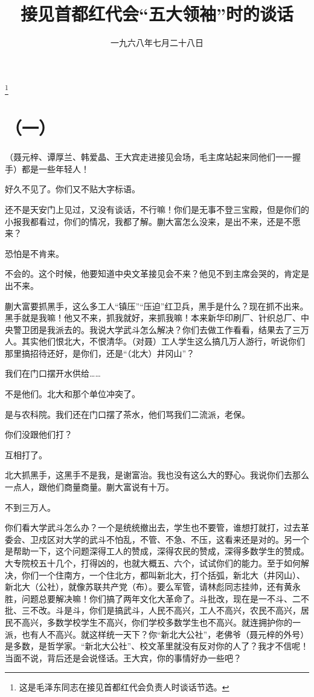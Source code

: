 
\title{接见首都红代会“五大领袖”时的谈话}
\date{一九六八年七月二十八日}
\thanks{这是毛泽东同志在接见首都红代会负责人时谈话节选。}
\maketitle


\section*{（一）}

（聂元梓、谭厚兰、韩爱晶、王大宾走进接见会场，毛主席站起来同他们一一握手）都是一些年轻人！

好久不见了。你们又不贴大字标语。

还不是天安门上见过，又没有谈话，不行嘛！你们是无事不登三宝殿，但是你们的小报我都看过，你们的情况，我都了解。蒯大富怎么没来，是出不来，还是不愿来？

恐怕是不肯来。

不会的。这个时候，他要知道中央文革接见会不来？他见不到主席会哭的，肯定是出不来。

蒯大富要抓黑手，这么多工人“镇压”“压迫”红卫兵，黑手是什么？现在抓不出来。黑手就是我嘛！他又不来，抓我就好，来抓我嘛！本来新华印刷厂、针织总厂、中央警卫团是我派去的。我说大学武斗怎么解决？你们去做工作看看，结果去了三万人。其实他们恨北大，不恨清华。（对聂）工人学生这么搞几万人游行，听说你们那里搞招待还好，是你们，还是“（北大）井冈山”？

我们在门口摆开水供给……

不是他们。北大和那个单位冲突了。

是与农科院。我们还在门口摆了茶水，他们骂我们二流派，老保。

你们没跟他们打？

互相打了。

北大抓黑手，这黑手不是我，是谢富治。我也没有这么大的野心。我说你们去那么一点人，跟他们商量商量。蒯大富说有十万。

不到三万人。

你们看大学武斗怎么办？一个是统统撤出去，学生也不要管，谁想打就打，过去革委会、卫戍区对大学的武斗不怕乱，不管、不急、不压，这看来还是对的。另一个是帮助一下，这个问题深得工人的赞成，深得农民的赞成，深得多数学生的赞成。大专院校五十几个，打得凶的，也就大概五、六个，试试你们的能力。至于如何解决，你们一个住南方，一个住北方，都叫新北大，打个括弧，新北大（井冈山）、新北大（公社），就像苏联共产党（布）。要么军管，请林彪同志挂帅，还有黄永胜，问题总要解决嘛！你们搞了两年文化大革命了。斗批改，现在是一不斗、二不批、三不改。斗是斗，你们是搞武斗，人民不高兴，工人不高兴，农民不高兴，居民不高兴，多数学校学生不高兴，你们学校多数学生也不高兴。就连拥护你的一派，也有人不高兴。就这样统一天下？你“新北大公社”，老佛爷（聂元梓的外号）是多数，是哲学家。“新北大公社”、校文革里就没有反对你的人了？我才不信呢！当面不说，背后还是会说怪话。王大宾，你的事情好办一些吧？


